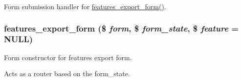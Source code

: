 Form submission handler for \hyperlink{features_8admin_8inc_ac6d72d74ab676748b1197536446c1063}{features\_\-export\_\-form()}. \hypertarget{features_8admin_8inc_ac6d72d74ab676748b1197536446c1063}{
\subsubsection[{features\_\-export\_\-form}]{\setlength{\rightskip}{0pt plus 5cm}features\_\-export\_\-form (\$ {\em form}, \/  \$ {\em form\_\-state}, \/  \$ {\em feature} = {\ttfamily NULL})}}
\label{features_8admin_8inc_ac6d72d74ab676748b1197536446c1063}
Form constructor for features export form.

Acts as a router based on the form\_\-state.


